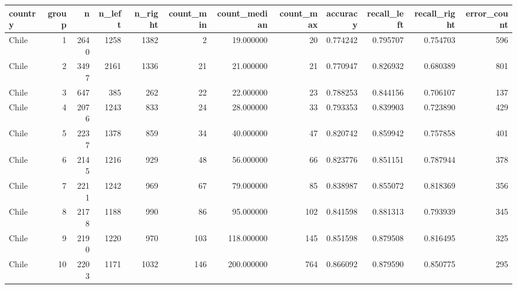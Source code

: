 \begin{tabular}{lrrrrrrrrrrr}
\toprule
country & group & n & n_left & n_right & count_min & count_median & count_max & accuracy & recall_left & recall_right & error_count \\
\midrule
Chile & 1 & 2640 & 1258 & 1382 & 2 & 19.000000 & 20 & 0.774242 & 0.795707 & 0.754703 & 596 \\
Chile & 2 & 3497 & 2161 & 1336 & 21 & 21.000000 & 21 & 0.770947 & 0.826932 & 0.680389 & 801 \\
Chile & 3 & 647 & 385 & 262 & 22 & 22.000000 & 23 & 0.788253 & 0.844156 & 0.706107 & 137 \\
Chile & 4 & 2076 & 1243 & 833 & 24 & 28.000000 & 33 & 0.793353 & 0.839903 & 0.723890 & 429 \\
Chile & 5 & 2237 & 1378 & 859 & 34 & 40.000000 & 47 & 0.820742 & 0.859942 & 0.757858 & 401 \\
Chile & 6 & 2145 & 1216 & 929 & 48 & 56.000000 & 66 & 0.823776 & 0.851151 & 0.787944 & 378 \\
Chile & 7 & 2211 & 1242 & 969 & 67 & 79.000000 & 85 & 0.838987 & 0.855072 & 0.818369 & 356 \\
Chile & 8 & 2178 & 1188 & 990 & 86 & 95.000000 & 102 & 0.841598 & 0.881313 & 0.793939 & 345 \\
Chile & 9 & 2190 & 1220 & 970 & 103 & 118.000000 & 145 & 0.851598 & 0.879508 & 0.816495 & 325 \\
Chile & 10 & 2203 & 1171 & 1032 & 146 & 200.000000 & 764 & 0.866092 & 0.879590 & 0.850775 & 295 \\
\bottomrule
\end{tabular}
